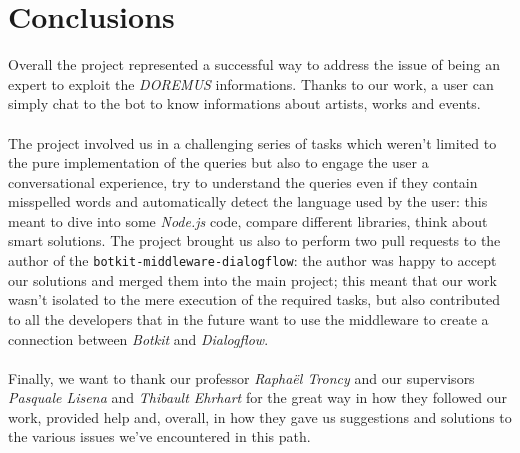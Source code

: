 \chapter{Conclusions}
	Overall the project represented a successful way to address the issue of being an expert to exploit the \textit{DOREMUS} informations. Thanks to our work, a user can simply chat to the bot to know informations about artists, works and events.\\\\
	The project involved us in a challenging series of tasks which weren't limited to the pure implementation of the queries but also to engage the user a conversational experience, try to understand the queries even if they contain misspelled words and automatically detect the language used by the user: this meant to dive into some \textit{Node.js} code, compare different libraries, think about smart solutions. The project brought us also to perform two pull requests to the author of the \texttt{botkit-middleware-dialogflow}: the author was happy to accept our solutions and merged them into the main project; this meant that our work wasn't isolated to the mere execution of the required tasks, but also contributed to all the developers that in the future want to use the middleware to create a connection between \textit{Botkit} and \textit{Dialogflow}.\\\\
	Finally, we want to thank our professor \textit{Raphaël Troncy} and our supervisors \textit{Pasquale Lisena} and \textit{Thibault Ehrhart} for the great way in how they followed our work, provided help and, overall, in how they gave us suggestions and solutions to the various issues we've encountered in this path.
	